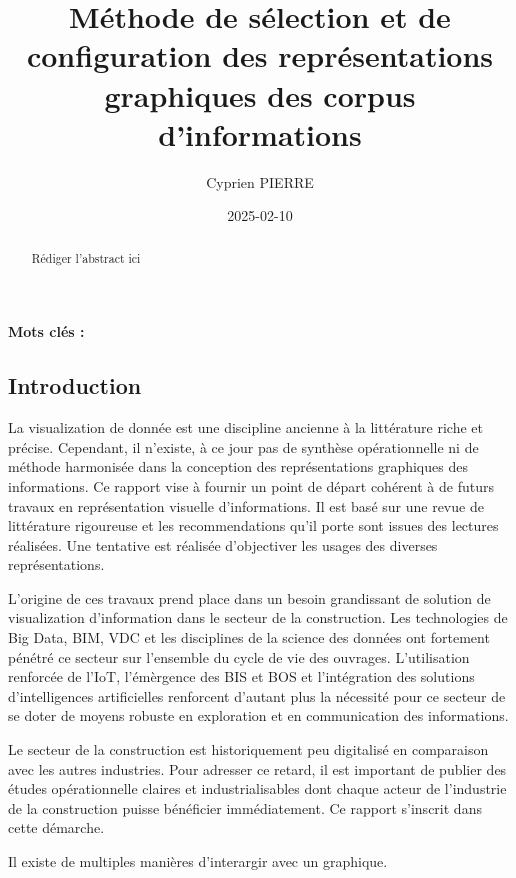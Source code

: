 \documentclass[a4paper,12pt]{article}
\author{Cyprien PIERRE \orcidlink{0009-0009-9040-6795}}
\date{2025-02-10}
\title{Méthode de sélection et de configuration des représentations graphiques des corpus d'informations}
\begin{document}
\maketitle
\begin{abstract}
Rédiger l'abstract ici
\end{abstract}

\renewcommand\{\keywordsname\{\textbf{Mots clés : }

\begin{multicols}{2}
\section*{Introduction}
\label{sec:org275cdbd}
La visualization de donnée est une discipline ancienne à la littérature riche et précise. Cependant, il n'existe, à ce jour pas de synthèse opérationnelle ni de méthode harmonisée dans la conception des représentations graphiques des informations. Ce rapport vise à fournir un point de départ cohérent à de futurs travaux en représentation visuelle d'informations. Il est basé sur une revue de littérature rigoureuse et les recommendations qu'il porte sont issues des lectures réalisées. Une tentative est réalisée d'objectiver les usages des diverses représentations.

L'origine de ces travaux prend place dans un besoin grandissant de solution de visualization d'information dans le secteur de la construction. Les technologies de Big Data, BIM, VDC et les disciplines de la science des données ont fortement pénétré ce secteur sur l'ensemble du cycle de vie des ouvrages. \autocite{asiauniversitytaichungtaiwanResearchApplicationFunctiontechnologyaesthetics2020} L'utilisation renforcée de l'IoT, l'émèrgence des BIS et BOS et l'intégration des solutions d'intelligences artificielles renforcent d'autant plus la nécessité pour ce secteur de se doter de moyens robuste en exploration et en communication des informations.

Le secteur de la construction est historiquement peu digitalisé en comparaison avec les autres industries. Pour adresser ce retard, il est important de publier des études opérationnelle claires et industrialisables dont chaque acteur de l'industrie de la construction puisse bénéficier immédiatement. Ce rapport s'inscrit dans cette démarche.

Il existe de multiples manières d'interargir avec un graphique. \autocite{schwabishCenteringAccessibilityData2022a,frankelavskyRightToolsJob2022}


\end{multicols}
\end{document}
